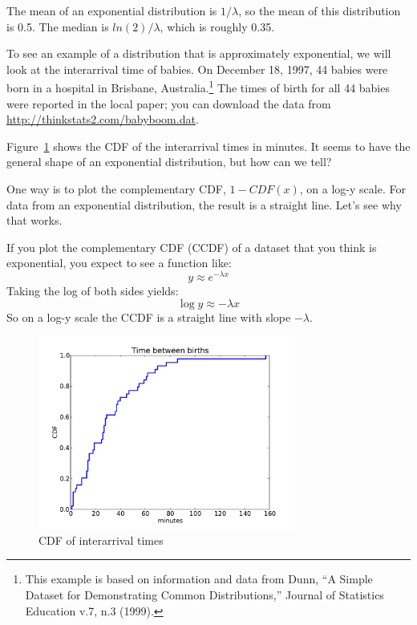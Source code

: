 \documentclass[12pt]{book}
\begin{document}
The mean of an exponential distribution is $1/\lambda$, so
the mean of this distribution is 0.5.  The median is $ln(2)/\lambda$,
which is roughly 0.35.    

To see an example of a distribution that is approximately exponential,
we will look at the interarrival time of babies.
On December 18, 1997, 44 babies were born in a hospital in Brisbane,
Australia.\footnote{This example is based on information and data from
  Dunn, ``A Simple Dataset for Demonstrating Common Distributions,''
  Journal of Statistics Education v.7, n.3 (1999).}  The times of
birth for all 44 babies were reported in the local paper; you can
download the data from \url{http://thinkstats2.com/babyboom.dat}.

Figure~\ref{interarrival_cdf} shows the CDF of the interarrival times
in minutes.  It seems to have the general shape of an exponential
distribution, but how can we tell?

One way is to plot the complementary CDF, $1 - CDF(x)$, on a
log-y scale.  For data from an exponential distribution, the result
is a straight line.  Let's see why that works.

If you plot the complementary CDF (CCDF) of a dataset that you think is
exponential, you expect to see a function like:
%
\[ y \approx e^{-\lambda x} \]
%
Taking the log of both sides yields:
%
\[ \log y \approx -\lambda x\]
%
So on a log-y scale the CCDF is a straight line
with slope $-\lambda$.

\begin{figure}
\centerline{\includegraphics[height=2.5in]{figs/interarrivals.pdf}}
\caption{CDF of interarrival times}
\label{interarrival_cdf}
\end{figure}
\end{document}
